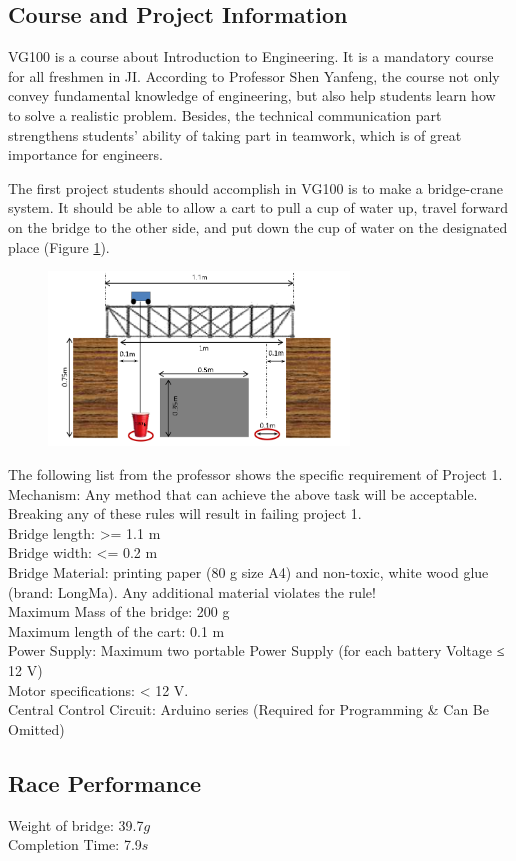 \subsection{Course and Project Information}


VG100 is a course about Introduction to Engineering. It is a mandatory course
for all freshmen in JI. According to Professor Shen Yanfeng, the course not only
convey fundamental knowledge of engineering, but also help students learn how to
solve a realistic problem. Besides, the technical communication part strengthens
students’ ability of taking part in teamwork, which is of great importance for
engineers.  

The first project students should accomplish in VG100 is to make a bridge-crane
system. It should be able to allow a cart to pull a cup of water up, travel
forward on the bridge to the other side, and put down the cup of water on the
designated place (Figure \ref{fig:structureOfP1}).  

\begin{figure}[H]
\centering
\includegraphics[width=8cm]{figure/structureOfP1}
\caption{\label{fig:structureOfP1}}
\end{figure}

The following list from the professor shows the specific requirement of Project 1.
Mechanism: Any method that can achieve the above task will be acceptable.
Breaking any of these rules will result in failing project 1. \\
Bridge length:  >= 1.1 m  \\
Bridge width:  <= 0.2 m \\
Bridge Material: printing paper (80 g size A4) and non-toxic, white wood glue 
(brand: LongMa). Any additional material violates the rule!  \\
Maximum Mass of the bridge: 200 g \\
Maximum length of the cart: 0.1 m \\
Power Supply: Maximum two portable Power Supply (for each battery Voltage ≤ 12 V) \\
Motor specifications: < 12 V. \\
Central Control Circuit: Arduino series (Required for Programming \& Can Be Omitted) \\

\subsection{Race Performance}
\noindent
Weight of bridge: 39.7$g$ \\
Completion Time: 7.9$s$